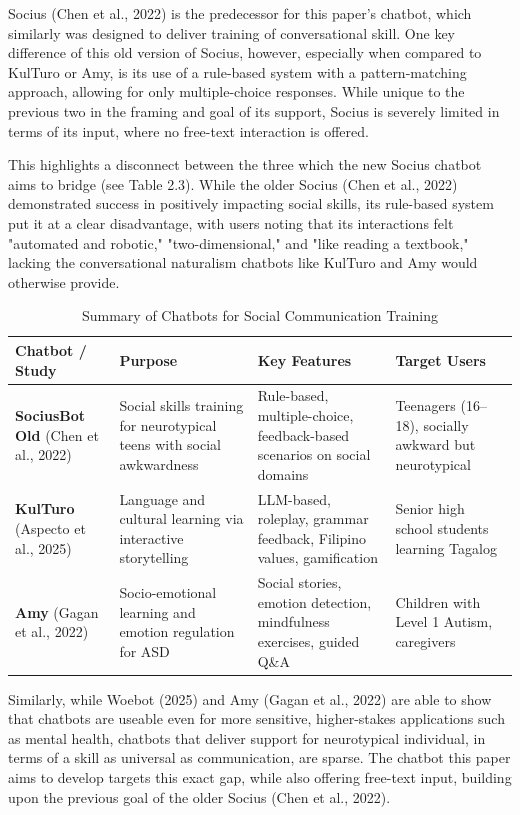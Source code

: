 Socius (Chen et al., 2022) is the predecessor for this paper’s chatbot, which similarly was designed to deliver training of conversational skill. One key difference of this old version of Socius, however, especially when compared to KulTuro or Amy, is its use of a rule-based system with a pattern-matching approach, allowing for only multiple-choice responses. While unique to the previous two in the framing and goal of its support, Socius is severely limited in terms of its input, where no free-text interaction is offered.

This highlights a disconnect between the three which the new Socius chatbot aims to bridge (see Table 2.3). While the older Socius (Chen et al., 2022) demonstrated success in positively impacting social skills, its rule-based system put it at a clear disadvantage, with users noting that its interactions felt "automated and robotic," "two-dimensional," and "like reading a textbook," lacking the conversational naturalism chatbots like KulTuro and Amy would otherwise provide.

\begin{table}[H]
\centering
\caption{Summary of Chatbots for Social Communication Training}
\small
\begin{tabular}{p{3.3cm} p{3.7cm} p{3.7cm} p{3.7cm}}
\toprule
\textbf{Chatbot / Study} & \textbf{Purpose} & \textbf{Key Features} & \textbf{Target Users} \\
\midrule
\textbf{SociusBot Old} \newline (Chen et al., 2022) & Social skills training for neurotypical teens with social awkwardness & Rule-based, multiple-choice, feedback-based scenarios on social domains & Teenagers (16–18), socially awkward but neurotypical \\
\textbf{KulTuro} \newline (Aspecto et al., 2025) & Language and cultural learning via interactive storytelling & LLM-based, roleplay, grammar feedback, Filipino values, gamification & Senior high school students learning Tagalog \\
\textbf{Amy} \newline (Gagan et al., 2022) & Socio-emotional learning and emotion regulation for ASD & Social stories, emotion detection, mindfulness exercises, guided Q\&A & Children with Level 1 Autism, caregivers \\
\bottomrule
\end{tabular}
\end{table}

Similarly, while Woebot (2025) and Amy (Gagan et al., 2022) are able to show that chatbots are useable even for more sensitive, higher-stakes applications such as mental health, chatbots that deliver support for neurotypical individual, in terms of a skill as universal as communication, are sparse. The chatbot this paper aims to develop targets this exact gap, while also offering free-text input, building upon the previous goal of the older Socius (Chen et al., 2022).


